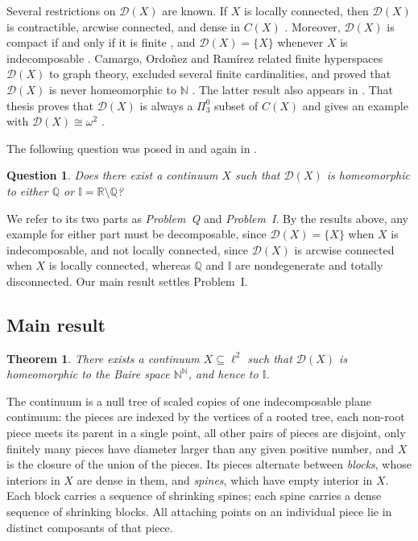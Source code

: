 \documentclass[11pt]{amsart}
\newtheorem{question}[theorem]{Question}
\newtheorem{introtheorem}{Theorem}
\theoremstyle{definition}
\theoremstyle{remark}
\newcommand{\D}{\mathcal{D}}
\newcommand{\N}{\mathbb{N}}
\newcommand{\Q}{\mathbb{Q}}
\newcommand{\R}{\mathbb{R}}
\newcommand{\I}{\mathbb{I}}
\begin{document}
Several restrictions on $\D(X)$ are known. If $X$ is locally connected, then $\D(X)$ is contractible, arcwise connected, and dense in $C(X)$ \cite[Theorem~3.6]{Or18}. Moreover, $\D(X)$ is compact if and only if it is finite \cite[Corollary~4.13]{Or18}, and $\D(X)=\{X\}$ whenever $X$ is indecomposable \cite[Theorem~3.7]{Or18}. Camargo, Ordo\~nez and Ram\'irez \cite{CORa} related finite hyperspaces $\D(X)$ to graph theory, excluded several finite cardinalities, and proved that $\D(X)$ is never homeomorphic to $\N$ \cite[Theorem~3.25]{CORa}. The latter result also appears in \cite[Teorema~3.2.13]{Ra}. That thesis proves that $\D(X)$ is always a $\Pi^0_3$ subset of $C(X)$ and gives an example with $\D(X)\cong\omega^2$ \cite[Teorema~2.0.2 and Ejemplo~3.2.1]{Ra}.

The following question was posed in \cite[Pregunta~3.2.14]{Ra} and again in \cite[Question~3.26]{CORa}.

\begin{question}\label{q:main}
Does there exist a continuum $X$ such that $\D(X)$ is homeomorphic to either $\Q$ or $\I=\R\setminus\Q$?
\end{question}

We refer to its two parts as \emph{Problem~Q} and \emph{Problem~I}. By the results above, any example for either part must be decomposable, since $\D(X)=\{X\}$ when $X$ is indecomposable, and not locally connected, since $\D(X)$ is arcwise connected when $X$ is locally connected, whereas $\Q$ and $\I$ are nondegenerate and totally disconnected. Our main result settles Problem~I.

\subsection{Main result}

\begin{introtheorem}\label{thm:A}
There exists a continuum $X\subseteq\ell^2$ such that $\D(X)$ is homeomorphic to the Baire space $\N^\N$, and hence to $\I$.
\end{introtheorem}

The continuum is a null tree of scaled copies of one indecomposable plane continuum: the pieces are indexed by the vertices of a rooted tree, each non-root piece meets its parent in a single point, all other pairs of pieces are disjoint, only finitely many pieces have diameter larger than any given positive number, and $X$ is the closure of the union of the pieces. Its pieces alternate between \emph{blocks}, whose interiors in $X$ are dense in them, and \emph{spines}, which have empty interior in $X$. Each block carries a sequence of shrinking spines; each spine carries a dense sequence of shrinking blocks. All attaching points on an individual piece lie in distinct composants of that piece.
\end{document}
